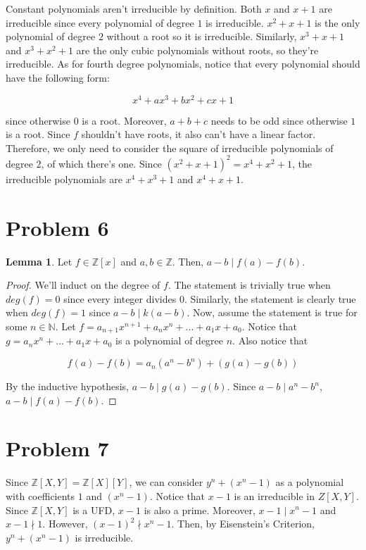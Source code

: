 \documentclass{article}
\theoremstyle{definition}
\newtheorem{lemma}[theorem]{Lemma}
\begin{document}
Constant polynomials aren't irreducible by definition. Both $x$ and $x + 1$ are irreducible since every polynomial of degree $1$ is irreducible. $x^{2} + x + 1$ is the only polynomial of degree $2$ without a root so it is irreducible. Similarly, $x^{3} + x + 1$ and $x^{3} + x^{2} + 1$ are the only cubic polynomials without roots, so they're irreducible. As for fourth degree polynomials, notice that every polynomial should have the following form: 

\[ x^{4} + ax^{3} + bx^{2} +cx + 1\]

since otherwise $0$ is a root. Moreover, $a + b + c$ needs to be odd since otherwise $1$ is a root. Since $f$ shouldn't have roots, it also can't have a linear factor. Therefore, we only need to consider the square of irreducible polynomials of degree $2$, of which there's one. Since $(x^{2} + x + 1)^2 = x^{4} + x^{2} + 1$, the irreducible polynomials are $x^{4} + x^{3} + 1$ and $x^{4} + x + 1$.

\section{Problem 6}

\begin{lemma}
    Let $f \in \mathbb{Z}[x]$ and $a,b \in \mathbb{Z}$. Then, $a - b \mid f(a) - f(b)$.
\end{lemma}
\begin{proof}
    We'll induct on the degree of $f$.
    The statement is trivially true when $deg(f) = 0$ since every integer divides $0$. Similarly, the statement is clearly true when $deg(f) = 1$ since $a - b \mid k(a - b)$. Now, assume the statement is true for some $n \in \mathbb{N}$. Let $f = a_{n+1}x^{n+1} + a_{n}x^{n} + ... + a_{1}x + a_{0}$. Notice that $g = a_{n}x^{n} + ... + a_{1}x + a_{0}$ is a polynomial of degree $n$. Also notice that 

    \[ f(a) - f(b) = a_{n}(a^{n} - b^{n}) + (g(a) - g(b))\]
    
    
    By the inductive hypothesis, $a - b \mid g(a) - g(b)$. Since $a - b \mid a^{n} - b^{n}$, $a - b \mid f(a) - f(b)$.
\end{proof}


\section{Problem 7}

Since $\mathbb{Z}[X,Y] = \mathbb{Z}[X][Y]$, we can consider $y^{n} + (x^{n} - 1)$ as a polynomial with coefficients $1$ and $(x^{n} - 1)$. Notice that $x - 1$ is an irreducible in $Z[X,Y]$. Since $\mathbb{Z}[X,Y]$ is a UFD, $x - 1$ is also a prime. Moreover, $x - 1 \mid x^{n} - 1$ and $x - 1 \nmid 1$. However, $(x-1)^2 \nmid x^{n} - 1$. Then, by Eisenstein's Criterion, $y^{n} + (x^{n} - 1)$ is irreducible.
\end{document}
